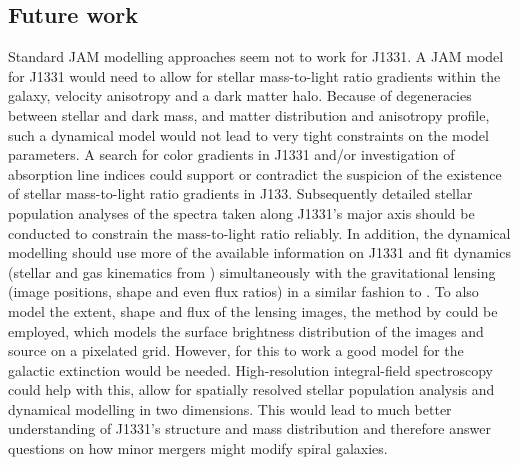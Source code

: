 \subsection{Future work}

Standard JAM modelling approaches seem not to work for J1331. A JAM model for J1331 would need to allow for stellar mass-to-light ratio gradients within the galaxy, velocity anisotropy and a dark matter halo. Because of degeneracies between stellar and dark mass, and matter distribution and anisotropy profile, such a dynamical model would not lead to very tight constraints on the model parameters.  A search for color gradients in J1331 and/or investigation of absorption line indices could support or contradict the suspicion of the existence of stellar mass-to-light ratio gradients in J133. Subsequently detailed stellar population analyses of the spectra taken along J1331's major axis should be conducted to constrain the mass-to-light ratio reliably. In addition, the dynamical modelling should use more of the available information on J1331 and fit dynamics (stellar and gas kinematics from \citet{SWELLSV}) simultaneously with the gravitational lensing (image positions, shape and even flux ratios) in a similar fashion to \citet{SWELLSIV}. To also model the extent, shape and flux of the lensing images, the method by \citet{2004ApJ...611..739T,2003ApJ...590..673W} could be employed, which models the surface brightness distribution of the images and source on a pixelated grid. However, for this to work a good model for the galactic extinction would be needed. High-resolution integral-field spectroscopy could help with this, allow for spatially resolved stellar population analysis and dynamical modelling in two dimensions. This would lead to much better understanding of J1331's structure and mass distribution and therefore answer questions on how minor mergers might modify spiral galaxies.